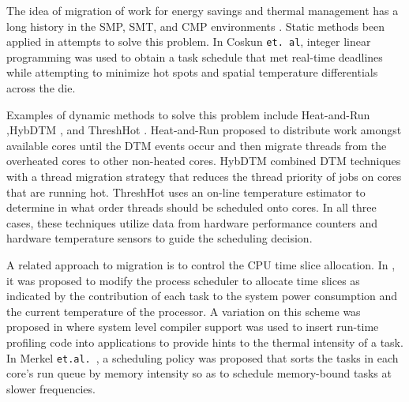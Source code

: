 The idea of migration of work for energy savings and thermal management
has a long history in the SMP, SMT, and CMP environments
\cite{Yao1995}. Static methods been applied in attempts to solve this
problem.  In Coskun \texttt{et. al}\cite{Coskun2008a}, integer linear
programming was used to obtain a task schedule that met real-time
deadlines while attempting to minimize hot spots and spatial temperature
differentials across the die.

Examples of dynamic methods to solve this problem include Heat-and-Run
\cite{Gomaa2004},HybDTM \cite{Kumar2006}, and ThreshHot \cite{Yang2008,Zhou2010b}.
Heat-and-Run proposed to distribute work amongst available cores until
the DTM events occur and then migrate threads from the overheated cores
to other non-heated cores. HybDTM combined DTM techniques with a thread
migration strategy that reduces the thread priority of jobs on cores
that are running hot. ThreshHot uses an on-line temperature estimator to
determine in what order threads should be scheduled onto cores. In all
three cases, these techniques utilize data from hardware performance
counters and hardware temperature sensors to guide the scheduling
decision.

A related approach to migration is to control the CPU time slice
allocation.  In , it was
proposed to modify the process scheduler to allocate time slices as
indicated by the contribution of each task to the system power
consumption and the current temperature of the processor. A variation on
this scheme was proposed in \cite{LiK2008} where system level compiler
support was used to insert run-time profiling code into applications to
provide hints to the thermal intensity of a task. In Merkel
\texttt{et.al.}~\cite{Merkel2008b,Merkel2010}, a scheduling policy was proposed
that sorts the tasks in each core's run queue by memory intensity so as
to schedule memory-bound tasks at slower frequencies.
